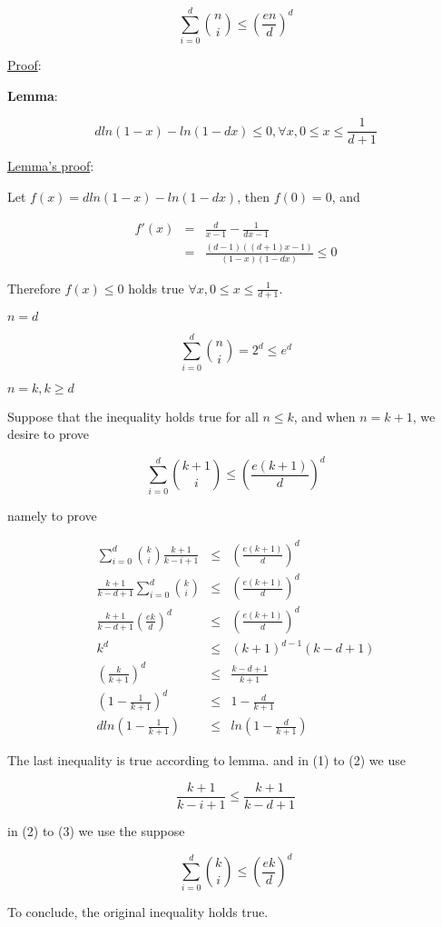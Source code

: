 \documentclass[UTF8]{ctexart}
\begin{document}
\begin{equation*}
\sum_{i=0}^{d}\binom{n}{i}\leq(\frac{en}{d})^{d}
\end{equation*}\par
\uline{Proof}:\par
\textbf{Lemma}:\par
\begin{equation*}
dln(1-x)-ln(1-dx)\leq 0,\forall x, 0\leq x\leq \frac{1}{d+1}
\end{equation*}\par
\uline{Lemma's proof}:\par
Let $f(x)=dln(1-x)-ln(1-dx)$, then $f(0)=0$, and\par
\begin{eqnarray*}
f'(x) &=&\frac{d}{x-1}-\frac{1}{dx-1} \\
&=&\frac{(d-1)((d+1)x-1)}{(1-x)(1-dx)}\leq 0
\end{eqnarray*}\par
Therefore $f(x)\leq 0$ holds true $\forall x, 0\leq x\leq\frac{1}{d+1}$.\par
\uline{$n=d$}\par
\begin{equation*}
\sum_{i=0}^{d}\binom{n}{i}=2^{d}\leq e^{d}
\end{equation*}\par
\uline{$n=k,k\geq d$}\par
Suppose that the inequality holds true for all $n\leq k$, and when $n=k+1$, we desire to prove\par
\begin{equation*}
\sum_{i=0}^{d}\binom{k+1}{i}\leq(\frac{e(k+1)}{d})^{d}
\end{equation*}\par
namely to prove\par
\begin{eqnarray}
\sum_{i=0}^{d}\binom{k}{i}\frac{k+1}{k-i+1}&\leq&(\frac{e(k+1)}{d})^{d}\\
\frac{k+1}{k-d+1}\sum_{i=0}^{d}\binom{k}{i}&\leq&(\frac{e(k+1)}{d})^{d}\\
\frac{k+1}{k-d+1}(\frac{ek}{d})^{d}&\leq&(\frac{e(k+1)}{d})^{d}\\
k^{d}&\leq&(k+1)^{d-1}(k-d+1)\\
(\frac{k}{k+1})^{d}&\leq&\frac{k-d+1}{k+1}\\
(1-\frac{1}{k+1})^{d}&\leq&1-\frac{d}{k+1}\\
dln(1-\frac{1}{k+1})&\leq&ln(1-\frac{d}{k+1})
\end{eqnarray}\par
The last inequality is true according to lemma. and in (1) to (2) we use\par
\begin{equation*}
\frac{k+1}{k-i+1}\leq\frac{k+1}{k-d+1}
\end{equation*}\par
in (2) to (3) we use the suppose\par
\begin{equation*}
\sum_{i=0}^{d}\binom{k}{i}\leq(\frac{ek}{d})^{d}
\end{equation*}\par
To conclude, the original inequality holds true.
\end{document}
